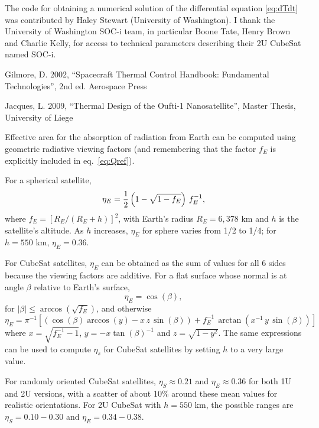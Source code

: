 \documentclass[]{aastex62}
\def\eq#1{\begin{equation} #1 \end{equation}}
\begin{document}
\vskip 0.2in 
{} 
The code for obtaining a numerical solution of the differential equation \ref{eq:dTdt} was contributed by 
Haley Stewart (University of Washington). I thank the University of Washington SOC-i team, in particular 
Boone Tate, Henry Brown and Charlie Kelly, for access to technical parameters describing their 2U CubeSat 
named SOC-i. 
 
%
%

\vskip 0.2in 
Gilmore, D. 2002, ``Spacecraft Thermal Control Handbook: Fundamental Technologies'', 2nd ed. Aerospace Press 

Jacques, L. 2009, ``Thermal Design of the Oufti-1 Nanosatellite'', Master Thesis, University of Liege


\newpage
\appendix{}

\vskip 0.2in

\vskip 0.1in
 Effective area for the absorption of radiation from Earth can be computed using geometric radiative viewing factors
(and remembering that the factor $f_E$ is explicitly included in eq.~\ref{eq:Qref}). 

For a spherical satellite, 
\eq{
                  \eta_E  =  {1\over 2}  \left(1 - \sqrt{1- f_E} \right) \, f_E^{-1},
} 
where $f_E=[R_E/(R_E+h)]^2$, with Earth's radius $R_E=6,378$ km and $h$ is the satellite's altitude. As $h$
increases, $\eta_E$ for sphere varies from 1/2 to 1/4; for $h=550$ km, $\eta_E=0.36$.

For CubeSat satellites, $\eta_E$ can be obtained as the sum of values for all 6 sides because the viewing
factors are additive. For a flat surface whose normal is at angle $\beta$ relative to Earth's surface, 
\eq{
            \eta_E  = \cos(\beta), 
} 
for $|\beta|\le\arccos(\sqrt{f_E})$, and otherwise
\eq{
            \eta_E  = \pi^{-1} \left[ \left( \cos(\beta)\arccos(y) - x \,z \, \sin(\beta) \right) + f_E^{-1} \, \arctan(x^{-1} \, y \, \sin(\beta)) \right] 
} 
where $x=\sqrt{f_E^{-1}-1}$, $y=-x\tan(\beta)^{-1}$ and $z=\sqrt{1-y^2}$. The same expressions can
be used to compute $\eta_s$ for CubeSat satellites by setting $h$ to a very large value. 

For randomly oriented CubeSat satellites, $\eta_S \approx 0.21$ and $\eta_E \approx 0.36$ for both 1U and 2U versions,
with a scatter of about 10\% around these mean values for realistic orientations. For 2U CubeSat
with $h=550$ km, the possible ranges are  $\eta_S = 0.10 - 0.30$ and $\eta_E = 0.34 - 0.38$. 
\end{document}
